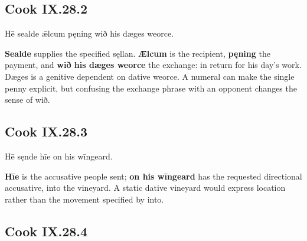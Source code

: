 \subsection*{Cook IX.28.2}

\par\begin{minipage}{\linewidth}\raggedright
Hē sealde ǣlcum pęning wið his dæges weorce.

\textbf{Sealde} supplies the specified sęllan. \textbf{Ǣlcum} is the recipient, \textbf{pęning} the payment, and \textbf{wið his dæges weorce} the exchange: in return for his day’s work. Dæges is a genitive dependent on dative weorce. A numeral can make the single penny explicit, but confusing the exchange phrase with an opponent changes the sense of wið.

\end{minipage}\par\addvspace{4pt}

\subsection*{Cook IX.28.3}

\par\begin{minipage}{\linewidth}\raggedright
Hē sęnde hīe on his wīngeard.

\textbf{Hīe} is the accusative people sent; \textbf{on his wīngeard} has the requested directional accusative, into the vineyard. A static dative vineyard would express location rather than the movement specified by into.

\end{minipage}\par\addvspace{4pt}

\subsection*{Cook IX.28.4}

